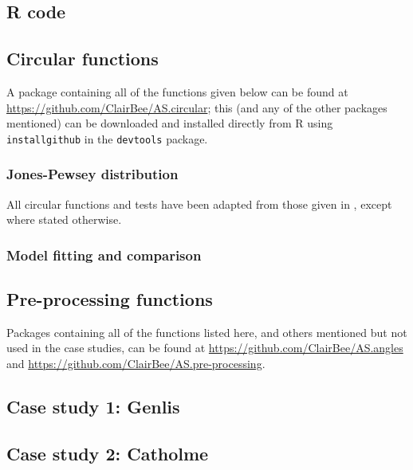 \documentclass[12pt,fleqn]{article}
\numberwithin{equation}{section}
\numberwithin{figure}{section}
\numberwithin{table}{section}
\begin{document}
\begin{appendix}
\section{R code}
\label{app:R-code}
\subsection{Circular functions}
A package containing all of the functions given below can be found at \url{https://github.com/ClairBee/AS.circular}; this (and any of the other packages mentioned) can be downloaded and installed directly from R using \texttt{install\textunderscore github} in the \texttt{devtools} package.

\subsubsection{Jones-Pewsey distribution}
All circular functions and tests have been adapted from those given in \cite{Pewsey2014}, except where stated otherwise. 
%

\subsubsection{Model fitting and comparison}
%

\subsection{Pre-processing functions}
Packages containing all of the functions listed here, and others mentioned but not used in the case studies, can be found at \url{https://github.com/ClairBee/AS.angles} and \url{https://github.com/ClairBee/AS.pre-processing}.
%

\subsection{Case study 1: Genlis}
\label{app:CS1}


\subsection{Case study 2: Catholme}
\label{app:CS2}


\end{appendix}

\newpage
\printbibliography
\end{document}
